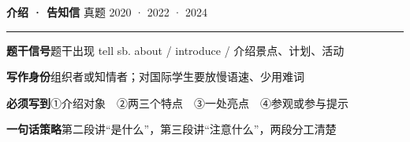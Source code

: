 \documentclass[11pt,a4paper]{ctexart}
\begin{document}
\clearpage
{}\label{g11}
\noindent{\color{accent}\rule{\linewidth}{1.5pt}}\par\vspace{3pt}
\hspace{6pt}
{\LARGE\bfseries 介绍 · 告知信}\hfill
{\footnotesize\color{gray} 真题 2020 · 2022 · 2024}\par
\vspace{1pt}
{\color{accent!35}\rule{\linewidth}{0.5pt}}\par\vspace{3pt}
{\footnotesize {\color{accent}\bfseries 题干信号}\quad 题干出现 tell sb. about / introduce / 介绍景点、计划、活动}\par
{\footnotesize {\color{accent}\bfseries 写作身份}\quad 组织者或知情者；对国际学生要放慢语速、少用难词}\par
{\footnotesize {\color{accent}\bfseries 必须写到}\quad ①介绍对象　②两三个特点　③一处亮点　④参观或参与提示}\par
{\footnotesize {\color{accent}\bfseries 一句话策略}\quad 第二段讲“是什么”，第三段讲“注意什么”，两段分工清楚}\par
\end{document}

